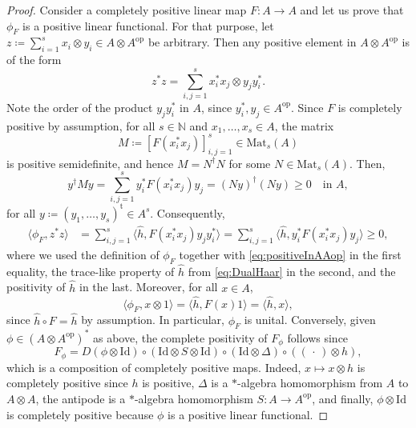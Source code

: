 \documentclass[a4paper,10pt]{amsart}
\newcommand{\eval}[2]{\langle #1 , #2\rangle}
\newcommand{\placeholder}{\,\cdot\,}
\theoremstyle{definition}
\begin{document}
\begin{proof}
Consider a completely positive linear map $F : A \to A$ and let us prove that $\phi_F$ is a positive linear functional.
For that purpose, let $z \coloneqq \sum_{i=1}^s x_i\otimes y_i \in A\otimes A^{\mathrm{op}}$ be arbitrary. Then any positive element in $A\otimes A^{\mathrm{op}}$ is of the form
\begin{equation}\label{eq:positiveInAAop}
z^*z = \sum_{i,j=1}^s x_i^* x_j \otimes  y_jy_i^*.
\end{equation}
Note the order of the product $y_jy_i^*$ in $A$, since $y_i^*,y_j\in A^{\mathrm{op}}$.
Since $F$ is completely positive by assumption, for all $s\in\mathbb{N}$ and $x_1,\ldots,x_s\in A$, the matrix
    \begin{equation}\label{eq:CPmatrix}
    	M \coloneqq [F(x_i^* x_j)]_{i,j=1}^{s} \in \mathrm{Mat}_s(A)
    \end{equation}
    is positive semidefinite, and hence $M= N^\dagger N$ for some $N\in \mathrm{Mat}_s(A)$. Then,
    \begin{equation}\label{eq:yMy_pos}
    	{y}^\dagger M {y}
    	= \sum_{i,j=1}^s y_i^* F(x_i^* x_j) y_j
    	= (N{y})^\dagger(N {y})
    	\geq 0 \quad\text{in } A,
    \end{equation}
    for all $y \coloneqq (y_1,\ldots,y_s)^{\mathrm{t}}\in A^s$. Consequently,
    \begin{align*}
    	\eval{\phi_F}{z^*z}
    	&=
    	\sum_{i,j=1}^s\eval{\hat{h}}{F(x_i^* x_j) y_j y_i^*}
    	=
    	\sum_{i,j=1}^s \eval{\hat{h}}{y_i^* F(x_i^* x_j) y_j}
    	\geq 0,
    \end{align*}
    where we used the definition of $\phi_F$ together with \cref{eq:positiveInAAop} in the first equality, the trace-like property of $\hat{h}$ from \cref{eq:DualHaar} in the second, and the positivity of $\hat{h}$ in the last.
    \smallbreak\noindent%
    Moreover, for all $x\in A$,
	\begin{equation}
    \eval{\phi_F}{x \otimes 1}
    =
    \eval{\hat{h}}{F(x)1}
    =
    \eval{\hat{h}}{x},
    \end{equation}
    since $\hat{h} \circ F = \hat{h}$ by assumption. In particular, $\phi_F$ is unital.
    \smallbreak\noindent%
	Conversely, given $\phi \in (A\otimes A^{\mathrm{op}})^*$ as above, the complete positivity of $F_\phi$ follows since
    \[ F_\phi = D (\phi\otimes \mathrm{Id}) \circ (\mathrm{Id}\otimes S\otimes \mathrm{Id}) \circ (\mathrm{Id}\otimes \Delta) \circ ((\placeholder)\otimes h),
    \]
    which is a composition of completely positive maps. Indeed, $x\mapsto x\otimes h$ is completely positive since $h$ is positive, $\Delta$ is a $*$-algebra homomorphism from $A$ to $A\otimes A$, the antipode is a $*$-algebra homomorphism $S:A\to A^{\mathrm{op}}$, and finally, $\phi\otimes \mathrm{Id}$ is completely positive because $\phi$ is a positive linear functional.

\end{proof}
\end{document}
